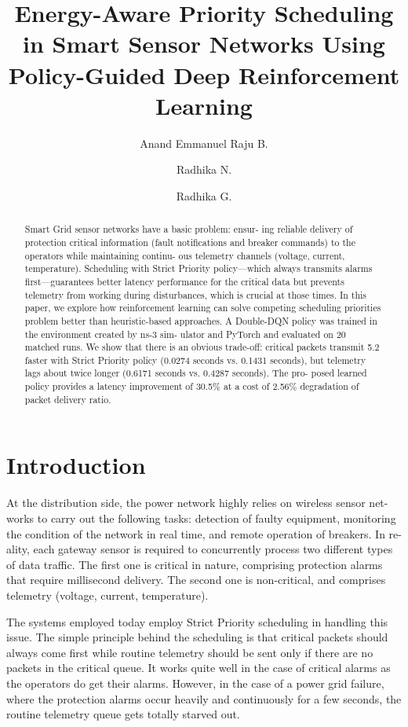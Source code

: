 \documentclass[runningheads,a4paper]{llncs}
\title{Energy-Aware Priority Scheduling in Smart Sensor Networks Using Policy-Guided Deep Reinforcement Learning}
\author{Anand Emmanuel Raju B.\inst{1} \and Radhika N.\inst{1} \and Radhika G.\inst{1}}
\institute{
Department of Computer Science and Engineering,\\
Amrita School of Computing, Coimbatore,\\
Amrita Vishwa Vidyapeetham, India\\
\email{cb.sc.p2cse25003@cb.students.amrita.edu, n\_radhika@cb.amrita.edu, g\_radhika@cb.amrita.edu}
}
\begin{document}
\maketitle

\begin{abstract}
Smart Grid sensor networks have a basic problem: ensur-
ing reliable delivery of protection critical information (fault notifications
and breaker commands) to the operators while maintaining continu-
ous telemetry channels (voltage, current, temperature). Scheduling with
Strict Priority policy—which always transmits alarms first—guarantees
better latency performance for the critical data but prevents telemetry
from working during disturbances, which is crucial at those times. In
this paper, we explore how reinforcement learning can solve competing
scheduling priorities problem better than heuristic-based approaches. A
Double-DQN policy was trained in the environment created by ns-3 sim-
ulator and PyTorch and evaluated on 20 matched runs. We show that
there is an obvious trade-off: critical packets transmit 5.2 faster with
Strict Priority policy (0.0274 seconds vs. 0.1431 seconds), but telemetry
lags about twice longer (0.6171 seconds vs. 0.4287 seconds). The pro-
posed learned policy provides a latency improvement of 30.5\% at a cost
of 2.56\% degradation of packet delivery ratio.

\end{abstract}

\section{Introduction}
At the distribution side, the power network highly relies on wireless sensor net-
works to carry out the following tasks: detection of faulty equipment, monitoring
the condition of the network in real time, and remote operation of breakers. In re-
ality, each gateway sensor is required to concurrently process two different types
of data traffic. The first one is critical in nature, comprising protection alarms
that require millisecond delivery. The second one is non-critical, and comprises
telemetry (voltage, current, temperature).

The systems employed today employ Strict Priority scheduling in handling
this issue. The simple principle behind the scheduling is that critical packets
should always come first while routine telemetry should be sent only if there are
no packets in the critical queue. It works quite well in the case of critical alarms
as the operators do get their alarms. However, in the case of a power grid failure,
where the protection alarms occur heavily and continuously for a few seconds,
the routine telemetry queue gets totally starved out.
\end{document}
